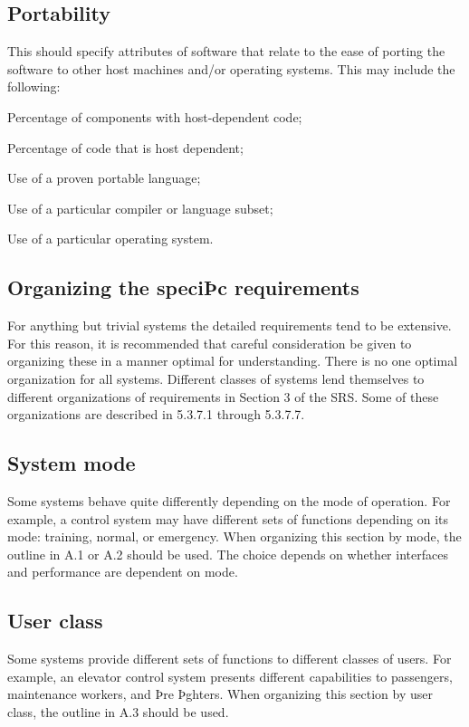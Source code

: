 	\subsection{Portability}
		This should specify attributes of software that relate to the ease of porting the software to other host machines and/or operating systems. This may include the following:
		
		Percentage of components with host-dependent code;
		
		Percentage of code that is host dependent;
		
		Use of a proven portable language; 
		
		Use of a particular compiler or language subset;
		
		Use of a particular operating system.
	
	\subsection{Organizing the speciÞc requirements}
		For anything but trivial systems the detailed requirements tend to be extensive. For this reason, it is recommended that careful consideration be given to organizing these in a manner optimal for understanding. There is no one optimal organization for all systems. Different classes of systems lend themselves to different organizations of requirements in Section 3 of the SRS. Some of these organizations are described in 5.3.7.1 through 5.3.7.7.
	
	\subsection{System mode}
		Some systems behave quite differently depending on the mode of operation. For example, a control system may have different sets of functions depending on its mode: training, normal, or emergency. When organizing this section by mode, the outline in A.1 or A.2 should be used. The choice depends on whether interfaces and performance are dependent on mode.
	
	\subsection{User class}
		Some systems provide different sets of functions to different classes of users. For example, an elevator control system presents different capabilities to passengers, maintenance workers, and Þre Þghters. When organizing this section by user class, the outline in A.3 should be used.
	
